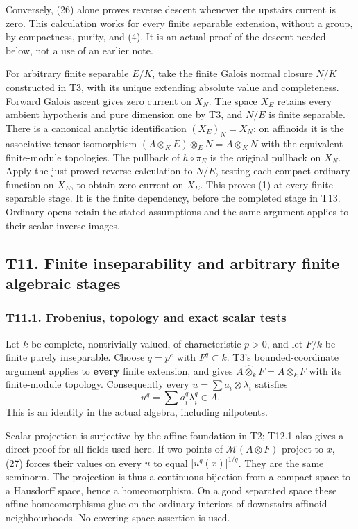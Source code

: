 \documentclass[
  10pt,
]{article}
\begin{document}
Conversely, (26) alone proves reverse descent whenever the upstairs
current is zero. This calculation works for every finite separable
extension, without a group, by compactness, purity, and (4). It is an
actual proof of the descent needed below, not a use of an earlier note.

For arbitrary finite separable \(E/K\), take the finite Galois normal
closure \(N/K\) constructed in T3, with its unique extending absolute
value and completeness. Forward Galois ascent gives zero current on
\(X_N\). The space \(X_E\) retains every ambient hypothesis and pure
dimension one by T3, and \(N/E\) is finite separable. There is a
canonical analytic identification \((X_E)_N=X_N\): on affinoids it is
the associative tensor isomorphism
\((A\otimes_K E)\otimes_E N=A\otimes_K N\) with the equivalent
finite-module topologies. The pullback of \(h\circ\pi_E\) is the
original pullback on \(X_N\). Apply the just-proved reverse calculation
to \(N/E\), testing each compact ordinary function on \(X_E\), to obtain
zero current on \(X_E\). This proves (1) at every finite separable
stage. It is the finite dependency, before the completed stage in T13.
Ordinary opens retain the stated assumptions and the same argument
applies to their scalar inverse images.

\subsection{T11. Finite inseparability and arbitrary finite algebraic
stages}\label{t11.-finite-inseparability-and-arbitrary-finite-algebraic-stages}

\subsubsection{T11.1. Frobenius, topology and exact scalar
tests}\label{t11.1.-frobenius-topology-and-exact-scalar-tests}

Let \(k\) be complete, nontrivially valued, of characteristic \(p>0\),
and let \(F/k\) be finite purely inseparable. Choose \(q=p^e\) with
\(F^q\subset k\). T3's bounded-coordinate argument applies to
\textbf{every} finite extension, and gives
\(A\widehat\otimes_k F=A\otimes_k F\) with its finite-module topology.
Consequently every \(u=\sum a_i\otimes\lambda_i\) satisfies \[
                    u^q=\sum a_i^q\lambda_i^q\in A.       \tag{27}
\] This is an identity in the actual algebra, including nilpotents.

Scalar projection is surjective by the affine foundation in T2; T12.1
also gives a direct proof for all fields used here. If two points of
\(\mathcal M(A\otimes F)\) project to \(x\), (27) forces their values on
every \(u\) to equal \(|u^q(x)|^{1/q}\). They are the same seminorm. The
projection is thus a continuous bijection from a compact space to a
Hausdorff space, hence a homeomorphism. On a good separated space these
affine homeomorphisms glue on the ordinary interiors of downstairs
affinoid neighbourhoods. No covering-space assertion is used.
\end{document}
